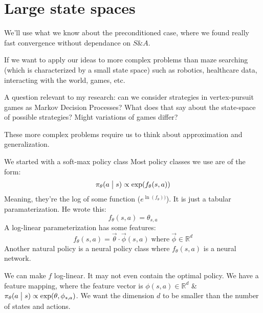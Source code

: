 \documentclass[12pt,reqno]{amsart}
\newcommand{\cond}[2]{( {#1} \bigm\vert {#2})}
\begin{document}
\section{Large state spaces}

We'll use what we know about the preconditioned case, where we found really fast convergence without dependance on $S \& A$.

If we want to apply our ideas to more complex problems than maze searching (which is characterized by a small state space) such as robotics, healthcare data, interacting with the world, games, etc. 

\begin{shaded}
A question relevant to my research: can we consider strategies in vertex-pursuit games as Markov Decision Processes? What does that say about the state-space of possible strategies? Might variations of games differ? 
\end{shaded}

These more complex problems require us to think about approximation and generalization.

We started with a soft-max policy class
Most policy classes we use are of the form:
\begin{equation}
\pi_\theta \cond{a}{s} \propto \exp(f_\theta(s,a))
\end{equation}
Meaning, they're the log of some function ($e^{\ln(f_\theta))}$). It is just a tabular paramaterization. He wrote this:
\begin{equation}
f_\theta(s,a)=\theta_{s,a}
\end{equation}
A log-linear parameterization has some features:
\begin{equation}
f_\theta(s,a) = \overrightarrow{\theta} \cdot \overrightarrow{\phi}(s,a) \; \textrm{where} \; \overrightarrow{\phi} \in \mathbb{R}^d
\end{equation}
Another natural policy is a neural policy class where $f_\theta(s,a)$ is a neural network.

We can make $f$ log-linear. It may not even contain the optimal policy. We have a feature mapping, where the feature vector is $\phi(s,a) \in \mathbb{R}^d$ \& $\pi_\theta\cond{a}{s} \propto \exp(\theta,\phi_{s,a})$. We want the dimension $d$ to be smaller than the number of states and actions. 
\end{document}
